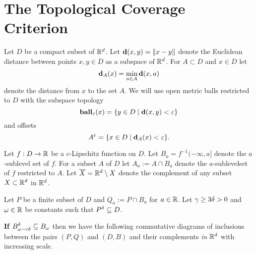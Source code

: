 
\section{The Topological Coverage Criterion}

Let $D$ be a compact subset of $\R^d$.
Let $\dist(x, y) = \|x - y\|$ denote the Euclidean distance between points $x,y\in D$ as a subspace of $\R^d$.
For $A\subset D$ and $x\in D$ let
\[\dist_A(x) = \min_{a\in A}\dist(x, a)\]
denote the distance from $x$ to the set $A$.
We will use open metric balls restricted to $D$ with the subspace topology
\[\ball_\e(x) = \{y\in D\mid \dist(x, y) < \e\}\]
and offsets
\[A^\e = \{x\in D\mid \dist_A(x) < \e\}.\]

Let $f : D\to \R$ be a $c$-Lipschitz function on $D$.
Let $B_a = f^{-1}(-\infty, a]$ denote the $a$-sublevel set of $f$.
For a subset $A$ of $D$ let $A_a := A\cap B_a$ denote the $a$-sublevelset of $f$ restricted to $A$.
Let $\overline{X} = \R^d\setminus X$ denote the complement of any subset $X\subset\R^d$ in $\R^d$.


Let $P$ be a finite subset of $D$ and $Q_a := P\cap B_a$ for $a\in\R$.
Let $\offf\geq 3\of > 0$ and $\omega\in\R$ be constants such that $\P \subseteq D$.


\textbf{If $B_{\fen}^\delta \subseteq \bb$} then we have the following commutative diagrams of inclusions between the pairs $(P,Q)$ and $(D, B)$ and their complements \emph{in $\R^d$} with increasing scale.


